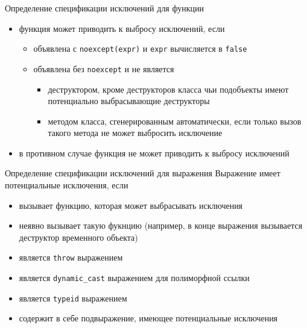 \documentclass[unknownkeysallowed,xcolor=table]{beamer}
\begin{document}
\begin{frame}{Определение спецификации исключений для функции}
  \begin{itemize}
    \item функция может приводить к выбросу исключений, если
      \begin{itemize}
        \item объявлена с \lstinline{noexcept(expr)} и \lstinline{expr} вычисляется в \lstinline{false} \vspace{0.5em}
        \item объявлена без \lstinline{noexcept} и не является
          \begin{itemize}
            \item деструктором, кроме деструкторов класса чьи подобъекты имеют потенциально выбрасывающие деструкторы \vspace{0.5em}
            \item методом класса, сгенерированным автоматически, если только вызов такого метода не может выбросить исключение \vspace{0.5em}
          \end{itemize}
      \end{itemize}
    \item в противном случае функция не может приводить к выбросу исключений
  \end{itemize}
\end{frame}

\begin{frame}{Определение спецификации исключений для выражения}
  Выражение имеет потенциальные исключения, если
  \begin{itemize}
    \item вызывает функцию, которая может выбрасывать исключения \vspace{0.5em}
    \item неявно вызывает такую фукнцию (например, в конце выражения вызывается деструктор временного объекта) \vspace{0.5em}
    \item является \lstinline{throw} выражением \vspace{0.5em}
    \item является \lstinline{dynamic_cast} выражением для полиморфной ссылки \vspace{0.5em}
    \item является \lstinline{typeid} выражением \vspace{0.5em}
    \item содержит в себе подвыражение, имеющее потенциальные исключения
  \end{itemize}
\end{frame}
\end{document}
